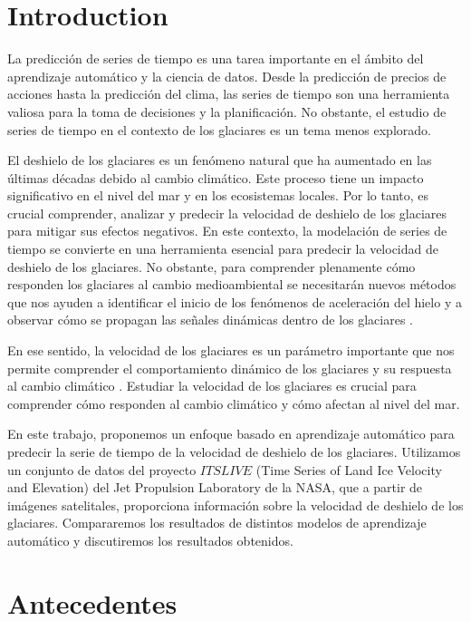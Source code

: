 \documentclass[sigconf,authordraft,language=spanish]{acmart}
\begin{document}
\section{Introduction}

La predicción de series de tiempo es una tarea importante en el
ámbito del aprendizaje automático y la ciencia de datos. Desde la
predicción de precios de acciones hasta la predicción del clima, las
series de tiempo son una herramienta valiosa para la toma de decisiones
y la planificación. No obstante, el estudio de series de tiempo en el contexto de los glaciares es un tema menos explorado.

El deshielo de los glaciares es un fenómeno natural que ha aumentado en las últimas décadas debido al cambio climático.
Este proceso tiene un impacto significativo en el nivel del mar y en los ecosistemas locales.
Por lo tanto, es crucial comprender, analizar y predecir la velocidad de deshielo de los glaciares para mitigar sus efectos negativos.
En este contexto, la modelación de series de tiempo se convierte en una herramienta esencial para predecir la velocidad de deshielo de los glaciares.
No obstante, para comprender plenamente cómo responden los glaciares al cambio medioambiental 
se necesitarán nuevos métodos que nos ayuden a identificar el inicio de los fenómenos de aceleración del hielo y a observar cómo se propagan las señales dinámicas dentro de los glaciares \cite{greene_detecting_2020}.

En ese sentido, la velocidad de los glaciares es un parámetro importante que nos permite comprender
el comportamiento dinámico de los glaciares y su respuesta al cambio climático \cite{zhang_validation_2024}.
Estudiar la velocidad de los glaciares es crucial para comprender cómo responden al cambio climático y cómo afectan al nivel del mar.

En este trabajo, proponemos un enfoque basado en aprendizaje automático para predecir la serie de tiempo de la velocidad de deshielo de los glaciares.
Utilizamos un conjunto de datos del proyecto $ITSLIVE$ (Time Series of Land Ice Velocity and Elevation) del Jet Propulsion Laboratory de la NASA, que a partir de imágenes satelitales, proporciona información sobre la velocidad de deshielo de los glaciares.
Compararemos los resultados de distintos modelos de aprendizaje automático y discutiremos los resultados obtenidos.

\section{Antecedentes}
\end{document}
